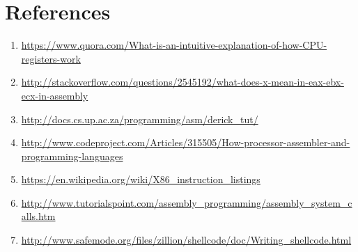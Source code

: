 \documentclass[10pt,a4paper]{book}
\begin{document}
\section{References}
\begin{enumerate}
\item \url{https://www.quora.com/What-is-an-intuitive-explanation-of-how-CPU-registers-work}
\item \url{http://stackoverflow.com/questions/2545192/what-does-x-mean-in-eax-ebx-ecx-in-assembly}
\item \url{http://docs.cs.up.ac.za/programming/asm/derick_tut/}
\item \url{http://www.codeproject.com/Articles/315505/How-processor-assembler-and-programming-languages}
\item \url{https://en.wikipedia.org/wiki/X86_instruction_listings}
\item \url{http://www.tutorialspoint.com/assembly_programming/assembly_system_calls.htm}
\item \url{http://www.safemode.org/files/zillion/shellcode/doc/Writing_shellcode.html}
\end{enumerate}
\end{document}
